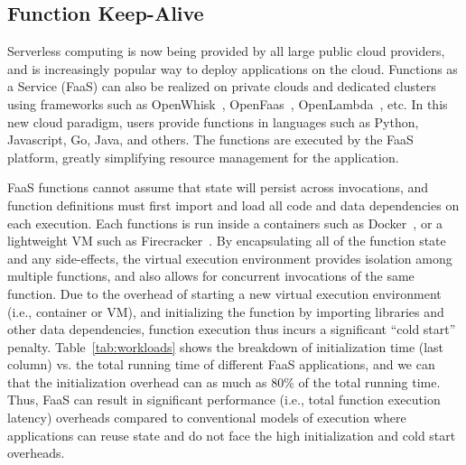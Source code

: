 

\subsection{Function Keep-Alive}
\vspace*{\subsecspace}

Serverless computing is now being provided by all large public cloud providers, and 
is increasingly popular way to deploy applications on the cloud.  
Functions as a Service (FaaS) can also be realized on private clouds and dedicated clusters using frameworks such as OpenWhisk~\cite{openwhisk}, OpenFaas~\cite{openfaas},  OpenLambda~\cite{hendrickson2016serverless}, etc. 
In this new cloud paradigm, users provide functions in languages such as Python, Javascript, Go, Java, and others. 
The functions are executed by the FaaS platform, greatly simplifying resource management for the application. 





%
%
FaaS functions cannot assume that state will persist across invocations, and function definitions must first import and load all code and data dependencies on each execution. 
Each functions is run inside a containers such as Docker~\cite{docker-main}, or a lightweight VM such as Firecracker~\cite{firecracker-nsdi20}. 
By encapsulating all of the function state and any side-effects, the virtual execution environment provides isolation among multiple functions, and also allows for concurrent invocations of the same function. 
Due to the overhead of starting a new virtual execution environment (i.e., container or VM), and initializing the function by importing libraries and other data dependencies, function execution thus incurs a significant ``cold start'' penalty.
Table~\ref{tab:workloads} shows the breakdown of initialization time (last column) vs. the total running time of different FaaS applications, and we can that the initialization overhead can as much as 80\% of the total running time. 
Thus, FaaS can result in significant performance (i.e., total function execution latency) overheads compared to conventional models of execution where applications can reuse state and do not face the high initialization and cold start overheads. 



